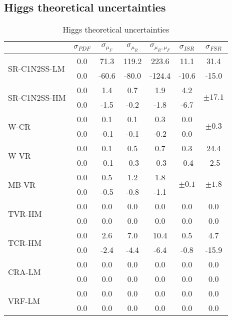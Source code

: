 \FloatBarrier
\subsection*{Higgs theoretical uncertainties}


\begin{table}[h]
\centering %
\begin{tabular}{|l|c|c|c|c|c|c|}
\hline 
 & $\sigma_{PDF}$ & $\sigma_{\mu_{F}}$ & $\sigma_{\mu_{R}}$ & $\sigma_{\mu_{R},\mu_{F}}$ & $\sigma_{ISR}$ & $\sigma_{FSR}$\tabularnewline
\hline 
\multirow{2}{*}{SR-C1N2SS-LM} & 0.0  & 71.3  & 119.2  & 223.6  & 11.1  & 31.4 \tabularnewline
 & 0.0  & -60.6  & -80.0  & -124.4  & -10.6  & -15.0\tabularnewline
\hline 
\multirow{2}{*}{SR-C1N2SS-HM} & 0.0  & 1.4  & 0.7  & 1.9  & 4.2  & \multirow{2}{*}{$\pm17.1$}\tabularnewline
 & 0.0  & -1.5  & -0.2  & -1.8  & -6.7  & \tabularnewline
\hline 
\multirow{2}{*}{W-CR} & 0.0  & 0.1  & 0.1  & 0.3  & 0.0  & \multirow{2}{*}{$\pm0.3$}\tabularnewline
 & 0.0  & -0.1  & -0.1  & -0.2  & 0.0  & \tabularnewline
\hline 
\multirow{2}{*}{W-VR} & 0.0  & 0.1  & 0.5  & 0.7  & 0.3  & 24.4 \tabularnewline
 & 0.0  & -0.1  & -0.3  & -0.3  & -0.4  & -2.5\tabularnewline
\hline 
\multirow{2}{*}{MB-VR} & 0.0  & 0.5  & 1.2  & 1.8  & \multirow{2}{*}{$\pm0.1$} & \multirow{2}{*}{$\pm1.8$}\tabularnewline
 & 0.0  & -0.5  & -0.8  & -1.1  &  & \tabularnewline
\hline 
\multirow{2}{*}{TVR-HM} & 0.0  & 0.0  & 0.0  & 0.0  & 0.0  & 0.0 \tabularnewline
 & 0.0  & 0.0  & 0.0  & 0.0  & 0.0  & 0.0\tabularnewline
\hline 
\multirow{2}{*}{TCR-HM} & 0.0  & 2.6  & 7.0  & 10.4  & 0.5  & 4.7 \tabularnewline
 & 0.0  & -2.4  & -4.4  & -6.4  & -0.8  & -15.9\tabularnewline
\hline 
\multirow{2}{*}{CRA-LM} & 0.0  & 0.0  & 0.0  & 0.0  & 0.0  & 0.0 \tabularnewline
 & 0.0  & 0.0  & 0.0  & 0.0  & 0.0  & 0.0\tabularnewline
\hline 
\multirow{2}{*}{VRF-LM} & 0.0  & 0.0  & 0.0  & 0.0  & 0.0  & 0.0 \tabularnewline
 & 0.0  & 0.0  & 0.0  & 0.0  & 0.0  & 0.0\tabularnewline
\hline 
\end{tabular}\caption{Higgs theoretical uncertainties}
\end{table}



